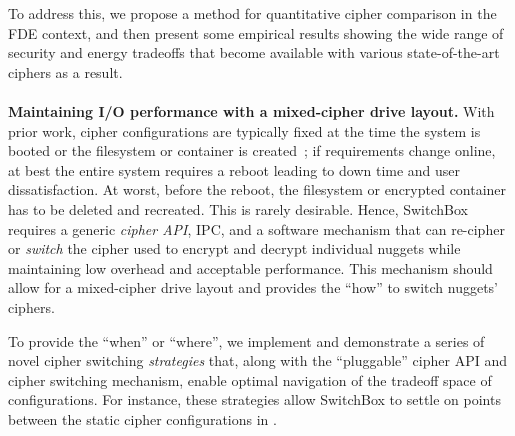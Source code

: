 To address this, we propose a method for quantitative cipher comparison in the
FDE context, and then present some empirical results showing the wide range of
security and energy tradeoffs that become available with various
state-of-the-art ciphers as a result.\\
\\
\textbf{Maintaining I/O performance with a mixed-cipher drive layout.} With
prior work, cipher configurations are typically fixed at the time the system is
booted or the filesystem or container is created~\cite{CiteAllTheFilesystems};
if requirements change online, at best the entire system requires a reboot
leading to down time and user dissatisfaction. At worst, before the reboot, the
filesystem or encrypted container has to be deleted and recreated. This is
rarely desirable. Hence, SwitchBox requires a generic \emph{cipher API}, IPC,
and a software mechanism that can re-cipher or \emph{switch} the cipher used to
encrypt and decrypt individual nuggets while maintaining low overhead and
acceptable performance. This mechanism should allow for a mixed-cipher drive
layout and provides the ``how'' to switch nuggets' ciphers.

To provide the ``when'' or ``where'', we implement and demonstrate a series of
novel cipher switching \textit{strategies} that, along with the ``pluggable''
cipher API and cipher switching mechanism, enable optimal navigation of the
tradeoff space of configurations. For instance, these strategies allow SwitchBox
to settle on points between the static cipher configurations in
.

